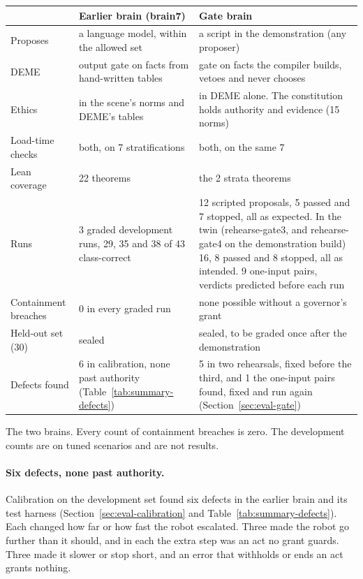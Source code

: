 \par\smallskip\noindent\begin{minipage}{\linewidth}\summarytable
\centering\footnotesize
\begin{tabularx}{\linewidth}{@{}H{27mm}LL@{}}
\toprule
& Earlier brain (brain7) & Gate brain \\
\midrule
Proposes & a language model, within the allowed set & a script in the demonstration (any proposer) \\
DEME & output gate on facts from hand-written tables & gate on facts the compiler builds, vetoes and never chooses \\
Ethics & in the scene's norms and DEME's tables & in DEME alone. The constitution holds authority and evidence (15 norms) \\
Load-time checks & both, on 7 stratifications & both, on the same 7 \\
Lean coverage & 22 theorems & the 2 strata theorems \\
Runs & 3 graded development runs, 29, 35 and 38 of 43 class-correct & 12 scripted proposals, 5 passed and 7 stopped, all as expected. In the twin (rehearse-gate3, and rehearse-gate4 on the demonstration build) 16, 8 passed and 8 stopped, all as intended. 9 one-input pairs, verdicts predicted before each run \\
Containment breaches & 0 in every graded run & none possible without a governor's grant \\
Held-out set (30) & sealed & sealed, to be graded once after the demonstration \\
Defects found & 6 in calibration, none past authority (Table~\ref{tab:summary-defects}) & 5 in two rehearsals, fixed before the third, and 1 the one-input pairs found, fixed and run again (Section~\ref{sec:eval-gate}) \\
\bottomrule
\end{tabularx}
\caption{The two brains. Every count of containment breaches is zero. The development counts
are on tuned scenarios and are not results.}
\label{tab:summary-brains}
\end{minipage}\par\smallskip

\paragraph{Six defects, none past authority.}
Calibration on the development set found six defects in the earlier brain and its test harness
(Section~\ref{sec:eval-calibration} and Table~\ref{tab:summary-defects}). Each changed how far or
how fast the robot escalated. Three made the robot go further than it should, and in each
the extra step was an act no grant guards. Three made it slower or stop short, and an error that
withholds or ends an act grants nothing.


